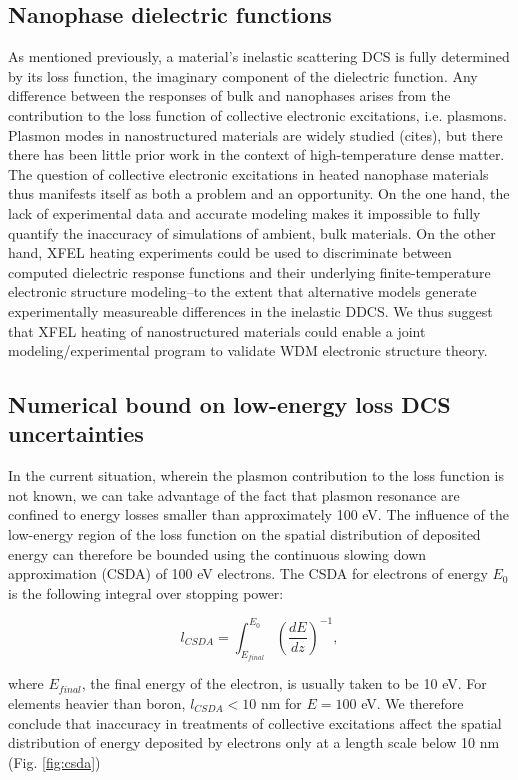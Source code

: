\documentclass [11pt, proquest, article] {uwthesis}[2016/11/22]
\begin{document}
\subsection{Nanophase dielectric functions}
As mentioned previously, a material's inelastic scattering DCS is fully determined by its loss function, the imaginary component of the dielectric function. Any difference between the responses of bulk and nanophases arises from the contribution to the loss function of collective electronic excitations, i.e. plasmons. Plasmon modes in nanostructured materials are widely studied (cites), but there there has been little prior work in the context of high-temperature dense matter. The question of collective electronic excitations in heated nanophase materials thus manifests itself as both a problem and an opportunity. On the one hand, the lack of experimental data and accurate modeling makes it impossible to fully quantify the inaccuracy of simulations of ambient, bulk materials. On the other hand, XFEL heating experiments could be used to discriminate between computed dielectric response functions and their underlying finite-temperature electronic structure modeling--to the extent that alternative models generate experimentally measureable differences in the inelastic DDCS. We thus suggest that XFEL heating of nanostructured materials could enable a joint modeling/experimental program to validate WDM electronic structure theory.

\subsection{Numerical bound on low-energy loss DCS uncertainties} \label{ledcs}
In the current situation, wherein the plasmon contribution to the loss function is not known, we can take advantage of the fact that plasmon resonance are confined to energy losses smaller than approximately 100 eV. The influence of the low-energy region of the loss function on the spatial distribution of deposited energy can therefore be bounded using the continuous slowing down approximation (CSDA) of 100 eV electrons. The CSDA for electrons of energy $E_0$ is the following integral over stopping power: 

$$
l_{CSDA} = \int_{E_{final}} ^ {E_0} (\frac{dE}{dz})^{-1},
$$

where $E_{final}$, the final energy of the electron, is usually taken to be 10 eV. For elements heavier than boron, $l_{CSDA} < 10$ nm for $E = 100$ eV. We therefore conclude that inaccuracy in treatments of collective excitations affect the spatial distribution of energy deposited by electrons only at a length scale below 10 nm (Fig. \ref{fig:csda})%
\end{document}
